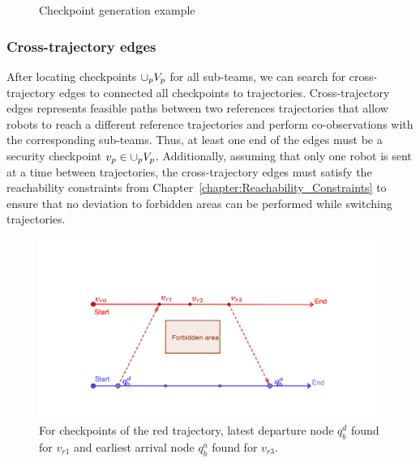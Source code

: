 \documentclass[journal]{IEEEtran}  %
\begin{document}
\begin{figure}
	\centering
    \caption{Checkpoint generation example}\label{fig:checkpoint-generate}
\end{figure}

\subsubsection{Cross-trajectory edges}\label{sec:cross-traj-edges}
After locating checkpoints $\cup_p V_p$ for all sub-teams, we can search for cross-trajectory edges to connected all checkpoints to trajectories. Cross-trajectory edges represents feasible paths between two references trajectories that allow robots to reach a different reference trajectories and perform co-observations with the corresponding sub-teams. Thus, at least one end of the edges must be a security checkpoint $v_{p} \in \cup_p V_p$. Additionally, assuming that only one robot is sent at a time between trajectories, the cross-trajectory edges must satisfy the reachability constraints from Chapter~\ref{chapter:Reachability_Constraints} to ensure that no deviation to forbidden areas can be performed while switching trajectories.  

\begin{figure}[htbp]
\begin{center}
\includegraphics[width=0.6\linewidth]{two_edges}
\caption{For checkpoints of the red trajectory, latest departure node $q^{d}_{b}$ found for $v_{r1}$ and earliest arrival node $q^{a}_{b}$ found for $v_{r3}$.}
\label{fig:two-edges}
\end{center}
\end{figure}
\end{document}
